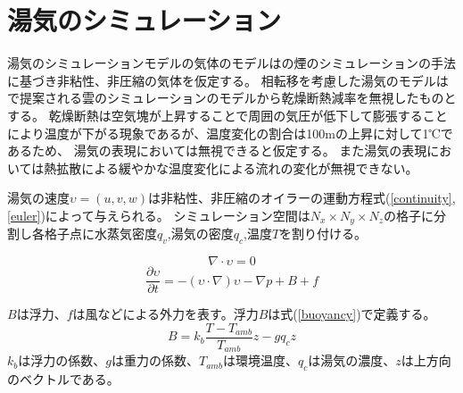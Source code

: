 \section{湯気のシミュレーション}

湯気のシミュレーションモデルの気体のモデルは\cite{Fedkiw2001}の煙のシミュレーションの手法に基づき非粘性、非圧縮の気体を仮定する。
相転移を考慮した湯気のモデルは\cite{Miyazaki2002}\cite{Dobashi2008}で提案される雲のシミュレーションのモデルから乾燥断熱減率を無視したものとする。
乾燥断熱は空気塊が上昇することで周囲の気圧が低下して膨張することにより温度が下がる現象であるが、温度変化の割合は100mの上昇に対して1℃であるため、
湯気の表現においては無視できると仮定する。
また湯気の表現においては熱拡散による緩やかな温度変化による流れの変化が無視できない。


湯気の速度$\upsilon=(u,v,w)$は非粘性、非圧縮のオイラーの運動方程式(\ref{continuity},\ref{euler})によって与えられる。
シミュレーション空間は$N_{x} \times N_{y} \times N_{z}$の格子に分割し各格子点に水蒸気密度$q_{v}$,湯気の密度$q_{c}$,温度$T$を割り付ける。

\begin{equation}
\label{continuity}
\nabla \cdot \upsilon = 0
\end{equation}
\begin{equation}
\label{euler}
\frac{\partial \upsilon}{\partial t} = -(\upsilon \cdot \nabla)\upsilon - \nabla p + B + f
\end{equation}

$B$は浮力、$f$は風などによる外力を表す。浮力$B$は式(\ref{buoyancy})で定義する。
\begin{equation}
\label{buoyancy}
B=k_{b}\frac{T-T_{amb}}{T_{amb}}z-gq_{c}z
\end{equation}
$k_{b}$は浮力の係数、$g$は重力の係数、$T_{amb}$は環境温度、$q_{c}$は湯気の濃度、$z$は上方向のベクトルである。

